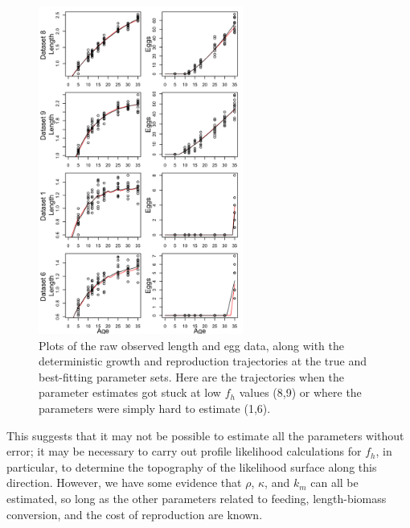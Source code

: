 \documentclass[12pt,reqno,final,pdftex]{amsart}\usepackage[]{graphicx}\usepackage[]{color}
\newenvironment{knitrout}{}{} %
\theoremstyle{plain}
\numberwithin{equation}{part}
\begin{document}
\begin{knitrout}\scriptsize
{}\color{fgcolor}\begin{figure}

\includegraphics[width=0.6\textwidth]{figure/unnamed-chunk-7-1} \hfill{}

\caption[Plots of the raw observed length and egg data, along with the deterministic growth and reproduction trajectories at the true and best-fitting parameter sets]{Plots of the raw observed length and egg data, along with the deterministic growth and reproduction trajectories at the true and best-fitting parameter sets. Here are the trajectories when the parameter estimates got stuck at low $f_h$ values (8,9) or where the parameters were simply hard to estimate (1,6).}\label{fig:unnamed-chunk-7}
\end{figure}


\end{knitrout}


\clearpage

This suggests that it may not be possible to estimate all the parameters without error; it may be necessary to carry out profile likelihood calculations for $f_h$, in particular, to determine the topography of the likelihood surface along this direction.
However, we have some evidence that $\rho$, $\kappa$, and $k_m$ can all be estimated, so long as the other parameters related to feeding, length-biomass conversion, and the cost of reproduction are known.
\end{document}
